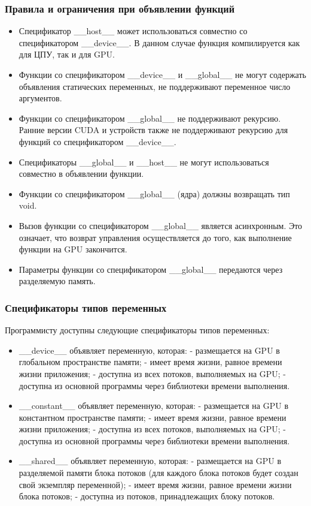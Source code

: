 \documentclass[a4paper, 12pt]{article}
\begin{document}
\subsubsection{Правила и ограничения при объявлении функций}
\begin{itemize}
    \item Спецификатор \_\_host\_\_ может использоваться совместно со 
    спецификатором \_\_device\_\_. В данном случае функция компилируется как для ЦПУ, так и для GPU. 
    \item Функции со спецификатором \_\_device\_\_ и \_\_global\_\_ не могут содержать объявления статических переменных, не поддерживают переменное число аргументов. 
    \item Функции со спецификатором \_\_global\_\_ не поддерживают рекурсию. Ранние версии CUDA и устройств также не поддерживают рекурсию для функций со спецификатором \_\_device\_\_. 
    \item Спецификаторы \_\_global\_\_ и \_\_host\_\_ не могут использоваться совместно в объявлении функции.  
    \item Функции со спецификатором \_\_global\_\_ (ядра) должны возвращать тип void.   
    \item Вызов функции со спецификатором \_\_global\_\_ является асинхронным. Это означает, что возврат управления осуществляется до того, как выполнение функции на GPU закончится. 
    \item Параметры функции со спецификатором \_\_global\_\_ передаются через разделяемую память.
\end{itemize}

\subsubsection{Спецификаторы типов переменных} 
Программисту доступны следующие спецификаторы типов переменных:
\begin{itemize}
\item \_\_device\_\_ объявляет переменную, которая: - размещается на GPU в глобальном пространстве памяти; - имеет время жизни, равное времени жизни приложения; - доступна из всех потоков, выполняемых на GPU; - доступна из основной программы через библиотеки времени выполнения.

\item \_\_constant\_\_ объявляет переменную, которая: - размещается на GPU в константном пространстве памяти; - имеет время жизни, равное времени 
жизни приложения; - доступна из всех потоков, выполняемых на GPU; - 
доступна из основной программы через библиотеки времени выполнения.

\item \_\_shared\_\_ объявляет переменную, которая: - размещается на GPU в разделяемой памяти блока потоков (для каждого блока потоков будет 
создан свой экземпляр переменной); - имеет время жизни, равное времени жизни блока потоков; - доступна из потоков, принадлежащих блоку потоков.
\end{itemize}
\end{document}
